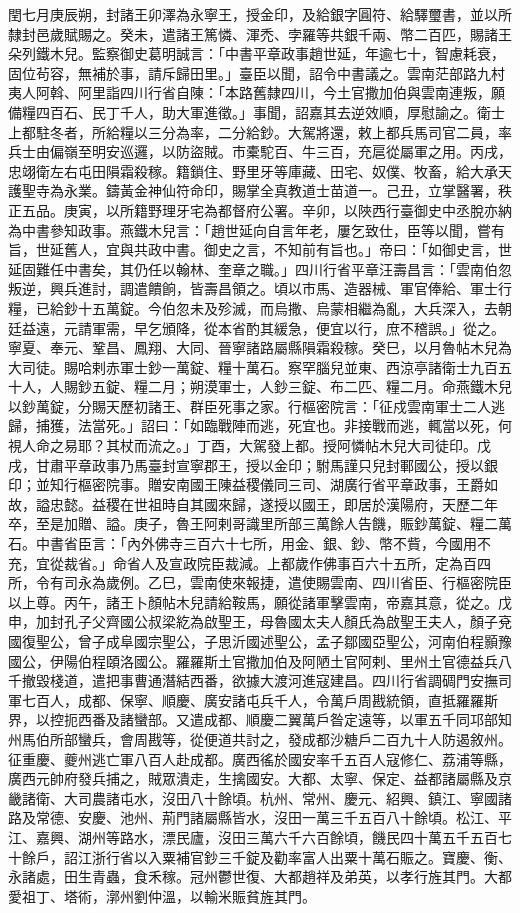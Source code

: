 \begin{pinyinscope}
 閏七月庚辰朔，封諸王卯澤為永寧王，授金印，及給銀字圓符、給驛璽書，並以所隸封邑歲賦賜之。癸未，遣諸王篤憐、渾禿、孛羅等共銀千兩、幣二百匹，賜諸王朵列鐵木兒。監察御史葛明誠言：「中書平章政事趙世延，年逾七十，智慮耗衰，固位茍容，無補於事，請斥歸田里。」臺臣以聞，詔令中書議之。雲南茫部路九村夷人阿斡、阿里詣四川行省自陳：「本路舊隸四川，今土官撒加伯與雲南連叛，願備糧四百石、民丁千人，助大軍進徵。」事聞，詔嘉其去逆效順，厚慰諭之。衛士上都駐冬者，所給糧以三分為率，二分給鈔。大駕將還，敕上都兵馬司官二員，率兵士由偏嶺至明安巡邏，以防盜賊。市橐駝百、牛三百，充扈從屬軍之用。丙戌，忠翊衛左右屯田隕霜殺稼。籍鎖住、野里牙等庫藏、田宅、奴僕、牧畜，給大承天護聖寺為永業。鑄黃金神仙符命印，賜掌全真教道士苗道一。己丑，立掌醫署，秩正五品。庚寅，以所籍野理牙宅為都督府公署。辛卯，以陜西行臺御史中丞脫亦納為中書參知政事。燕鐵木兒言：「趙世延向自言年老，屢乞致仕，臣等以聞，嘗有旨，世延舊人，宜與共政中書。御史之言，不知前有旨也。」帝曰：「如御史言，世延固難任中書矣，其仍任以翰林、奎章之職。」四川行省平章汪壽昌言：「雲南伯忽叛逆，興兵進討，調遣饋餉，皆壽昌領之。頃以市馬、造器械、軍官俸給、軍士行糧，已給鈔十五萬錠。今伯忽未及殄滅，而烏撒、烏蒙相繼為亂，大兵深入，去朝廷益遠，元請軍需，早乞頒降，從本省酌其緩急，便宜以行，庶不稽誤。」從之。寧夏、奉元、鞏昌、鳳翔、大同、晉寧諸路屬縣隕霜殺稼。癸巳，以月魯帖木兒為大司徒。賜哈剌赤軍士鈔一萬錠、糧十萬石。察罕腦兒並東、西涼亭諸衛士九百五十人，人賜鈔五錠、糧二月；朔漠軍士，人鈔三錠、布二匹、糧二月。命燕鐵木兒以鈔萬錠，分賜天歷初諸王、群臣死事之家。行樞密院言：「征戍雲南軍士二人逃歸，捕獲，法當死。」詔曰：「如臨戰陣而逃，死宜也。非接戰而逃，輒當以死，何視人命之易耶？其杖而流之。」丁酉，大駕發上都。授阿憐帖木兒大司徒印。戊戌，甘肅平章政事乃馬臺封宣寧郡王，授以金印；駙馬謹只兒封鄆國公，授以銀印；並知行樞密院事。贈安南國王陳益稷儀同三司、湖廣行省平章政事，王爵如故，謚忠懿。益稷在世祖時自其國來歸，遂授以國王，即居於漢陽府，天歷二年卒，至是加贈、謚。庚子，魯王阿剌哥識里所部三萬餘人告饑，賑鈔萬錠、糧二萬石。中書省臣言：「內外佛寺三百六十七所，用金、銀、鈔、幣不貲，今國用不充，宜從裁省。」命省人及宣政院臣裁減。上都歲作佛事百六十五所，定為百四所，令有司永為歲例。乙巳，雲南使來報捷，遣使賜雲南、四川省臣、行樞密院臣以上尊。丙午，諸王卜顏帖木兒請給鞍馬，願從諸軍擊雲南，帝嘉其意，從之。戊申，加封孔子父齊國公叔梁紇為啟聖王，母魯國太夫人顏氏為啟聖王夫人，顏子兗國復聖公，曾子成阜國宗聖公，子思沂國述聖公，孟子鄒國亞聖公，河南伯程顥豫國公，伊陽伯程頤洛國公。羅羅斯土官撒加伯及阿陋土官阿剌、里州土官德益兵八千撤毀棧道，遣把事曹通潛結西番，欲據大渡河進寇建昌。四川行省調碉門安撫司軍七百人，成都、保寧、順慶、廣安諸屯兵千人，令萬戶周戡統領，直抵羅羅斯界，以控扼西番及諸蠻部。又遣成都、順慶二翼萬戶昝定遠等，以軍五千同邛部知州馬伯所部蠻兵，會周戡等，從便道共討之，發成都沙糖戶二百九十人防遏敘州。征重慶、夔州逃亡軍八百人赴成都。廣西徭於國安率千五百人寇修仁、荔浦等縣，廣西元帥府發兵捕之，賊眾潰走，生擒國安。大都、太寧、保定、益都諸屬縣及京畿諸衛、大司農諸屯水，沒田八十餘頃。杭州、常州、慶元、紹興、鎮江、寧國諸路及常德、安慶、池州、荊門諸屬縣皆水，沒田一萬三千五百八十餘頃。松江、平江、嘉興、湖州等路水，漂民廬，沒田三萬六千六百餘頃，饑民四十萬五千五百七十餘戶，詔江浙行省以入粟補官鈔三千錠及勸率富人出粟十萬石賑之。寶慶、衡、永諸處，田生青蟲，食禾稼。冠州鬱世復、大都趙祥及弟英，以孝行旌其門。大都愛祖丁、塔術，漷州劉仲溫，以輸米賑貧旌其門。




\end{pinyinscope}
